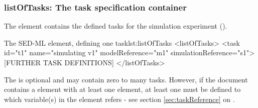   \subsubsection{listOfTasks: The task specification container}
\label{sec:listOfTasks}
The  element contains the defined tasks for the simulation experiment ().
%
%

%
\begin{myXmlLst}{The SED-ML  element, defining one task}{lst:listOfTasks}
<listOfTasks>
 <task id="t1" name="simulating v1" modelReference="m1" simulationReference="s1">
 [FURTHER TASK DEFINITIONS]
</listOfTasks>
\end{myXmlLst}
The  is optional and may contain zero to many tasks. However, if the \LoneVtwo document contains  a    element with at least one   element, at least one   must be defined to which variable(s) in the    element refers -  see  section \ref{sec:taskReference} on .

%

